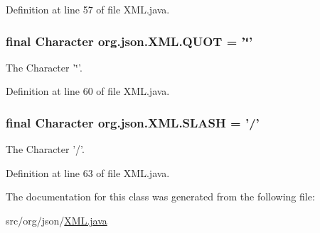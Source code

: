 Definition at line 57 of file X\-M\-L.\-java.

\hypertarget{classorg_1_1json_1_1XML_a4a8e56f228505f24fd24b70914d5078c}{
\subsubsection[{Q\-U\-O\-T}]{\setlength{\rightskip}{0pt plus 5cm}final Character org.\-json.\-X\-M\-L.\-Q\-U\-O\-T = '\char`\"{}'\hspace{0.3cm}{\ttfamily [static]}}}\label{classorg_1_1json_1_1XML_a4a8e56f228505f24fd24b70914d5078c}
The Character '\char`\"{}'. 

Definition at line 60 of file X\-M\-L.\-java.

\hypertarget{classorg_1_1json_1_1XML_aaa9a255bc94655b02d65b2c8525e5188}{
\subsubsection[{S\-L\-A\-S\-H}]{\setlength{\rightskip}{0pt plus 5cm}final Character org.\-json.\-X\-M\-L.\-S\-L\-A\-S\-H = '/'\hspace{0.3cm}{\ttfamily [static]}}}\label{classorg_1_1json_1_1XML_aaa9a255bc94655b02d65b2c8525e5188}
The Character '/'. 

Definition at line 63 of file X\-M\-L.\-java.



The documentation for this class was generated from the following file\-:\begin{DoxyCompactItemize}
\item 
src/org/json/\hyperlink{XML_8java}{X\-M\-L.\-java}\end{DoxyCompactItemize}
